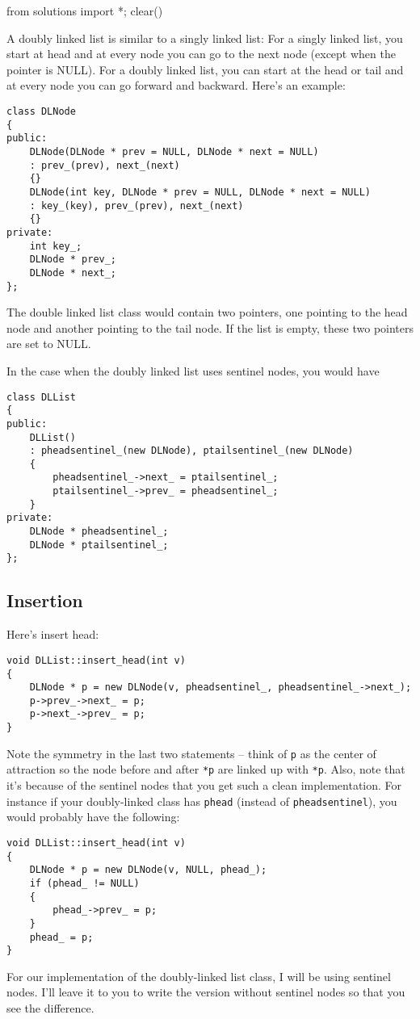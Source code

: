 \begin{python0}
from solutions import *; clear()
\end{python0}

A doubly linked list is similar to a singly linked list:
For a singly linked list, you start at head
and at every node you can go to the next node (except
when the pointer is NULL).
For a doubly linked list, you can start at the head or tail
and at every node you can go forward and backward.
Here's an example:


\begin{Verbatim}[frame=single,fontsize=\footnotesize]
class DLNode
{
public:
    DLNode(DLNode * prev = NULL, DLNode * next = NULL)
    : prev_(prev), next_(next)
    {}
    DLNode(int key, DLNode * prev = NULL, DLNode * next = NULL)
    : key_(key), prev_(prev), next_(next)
    {}
private:
    int key_;
    DLNode * prev_;
    DLNode * next_;
};
\end{Verbatim}

The double linked list class would contain two pointers,
one pointing to the head node
and another pointing to the tail node.
If the list is empty, these two pointers are set to NULL.

In the case when the doubly linked list uses
sentinel nodes, you would have
\begin{Verbatim}[frame=single,fontsize=\footnotesize]
class DLList
{
public:
    DLList()
    : pheadsentinel_(new DLNode), ptailsentinel_(new DLNode)
    {
        pheadsentinel_->next_ = ptailsentinel_;
        ptailsentinel_->prev_ = pheadsentinel_;      
    }
private:
    DLNode * pheadsentinel_;
    DLNode * ptailsentinel_;
};
\end{Verbatim}


\newpage
\subsection{Insertion}
Here's insert head:
\begin{Verbatim}[frame=single,fontsize=\footnotesize]
void DLList::insert_head(int v)
{
    DLNode * p = new DLNode(v, pheadsentinel_, pheadsentinel_->next_);
    p->prev_->next_ = p;
    p->next_->prev_ = p;
}
\end{Verbatim}
Note the symmetry in the last two statements -- think of \verb!p! as the
center of attraction so the node before and after \verb!*p! are linked up
with \verb!*p!.
Also, note that it's because of the sentinel nodes that you get
such a clean implementation.
For instance if your doubly-linked class has \verb!phead!
(instead of \verb!pheadsentinel!), you would probably have the following:
\begin{Verbatim}[frame=single,fontsize=\footnotesize]
void DLList::insert_head(int v)
{
    DLNode * p = new DLNode(v, NULL, phead_);
    if (phead_ != NULL)
    {
        phead_->prev_ = p;
    }
    phead_ = p;
}
\end{Verbatim}
For our implementation of the doubly-linked list class, I will be
using sentinel nodes.
I'll leave it to you to write the version without sentinel nodes so that you
see the difference.

